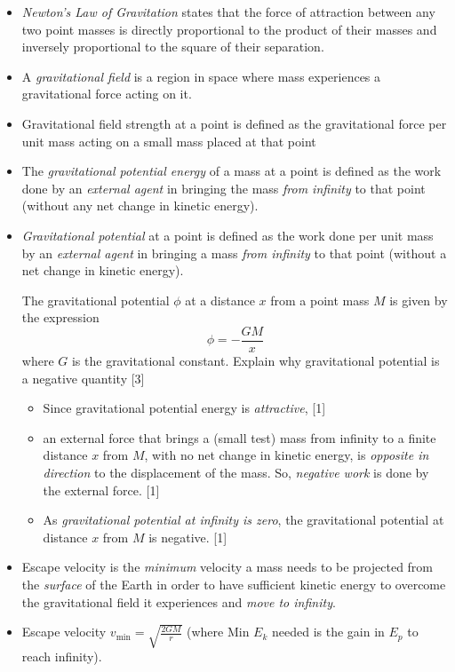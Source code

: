 \begin{itemize}
    \item \emph{Newton's Law of Gravitation} states that the force of attraction between any two point masses is directly proportional to the product of their masses and inversely proportional to the square of their separation.
    \item A \emph{gravitational field} is a region in space where mass experiences a gravitational force acting on it.
    \item Gravitational field strength at a point is defined as the gravitational force per unit mass acting on a small mass placed at that point
    \item The \emph{gravitational potential energy} of a mass at a point is defined as the work done by an \emph{external agent} in bringing the mass \emph{from infinity} to that point (without any net change in kinetic energy).
    \item \emph{Gravitational potential} at a point is defined as the work done per unit mass by an \emph{external agent} in bringing a mass \emph{from infinity} to that point (without a net change in kinetic energy).
    \begin{example}{}{}
        The gravitational potential \(\phi\) at a distance \(x\) from a point mass \(M\) is given by the expression
        \[\phi=-\frac{GM}{x}\]
        where \(G\) is the gravitational constant. Explain why gravitational potential is a negative quantity \hspace*{\fill} [3]
        \begin{itemize}
            \item Since gravitational potential energy is \emph{attractive}, \hspace*{\fill} [1]
            \item an external force that brings a (small test) mass from infinity to a finite distance \(x\) from \(M\), with no net change in kinetic energy, is \emph{opposite in direction} to the displacement of the mass. So, \emph{negative work} is done by the external force. \hspace*{\fill} [1]   
            \item As \emph{gravitational potential at infinity is zero}, the gravitational potential at distance \(x\) from \(M\) is negative. \hspace*{\fill} [1]
        \end{itemize}
    \end{example}
    \item Escape velocity is the \emph{minimum} velocity a mass needs to be projected from the \emph{surface} of the Earth in order to have sufficient kinetic energy to overcome the gravitational field it experiences and \emph{move to infinity}.
    \item Escape velocity \(v_\text{min}=\sqrt{\frac{2GM}{r}}\) (where Min \(E_k\) needed is the gain in \(E_p\) to reach infinity).
\end{itemize}

